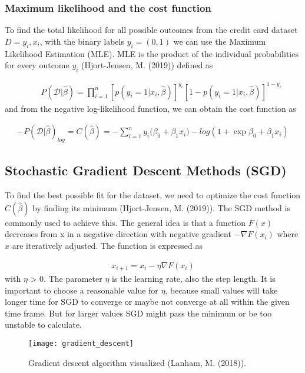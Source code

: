 \documentclass[11pt,english, A4]{article}
\begin{document}
\subsubsection{Maximum likelihood and the cost function}

To find the total likelihood for all possible outcomes from the credit card dataset $D = {y_i, x_i}$, with the binary labels $y_i  = {({0, 1})}$ we can use the Maximum Likelihood Estimation (MLE). MLE is the product of the individual probabilities for every outcome $y_i$ (Hjort-Jensen, M. (2019)) defined as

\begin{align}
\qquad P(\mathcal{D}|\hat{\beta}) =\prod_{i=1}^n [p(y_i = 1| x_i, \hat{\beta})]^{y_i}[1-p(y_i = 1| x_i, \hat{\beta})]^{1-y_i} 
\end{align}
and from the negative log-likelihood function, we can obtain the cost function as

\begin{align}
-{P(\mathcal{D}|\hat{\beta})_{log}} = C(\hat\beta) = - \sum_{i=1 }^{n} {y_i({\beta}_0 + {\beta}_1x_i}) - log(1+\exp{\beta}_0 + {\beta}_1x_i)
\end{align}


\subsection{Stochastic Gradient Descent Methods (SGD)}
To find the best possible fit for the dataset, we need to optimize the cost function $C(\hat\beta)$ by finding its minimum (Hjort-Jensen, M. (2019)). The SGD method is commonly used to achieve this. The general idea is that a function $F(x)$ decreases from x in a negative direction with negative gradient $- \nabla F({x}_i)$ where $\textit{x}$ are iteratively adjusted. The function is expressed as

\begin{align}
{x}_{i+1} = {x}_i - \eta\nabla F({x}_i)
\end{align}
with $\eta$ > 0.
The parameter $\eta$ is the learning rate, also the step length. It is important to choose a reasonable value for $\eta$, because small values will take longer time for SGD to converge or maybe not converge at all within the given time frame.  But for larger values SGD might pass the minimum or be too unstable to calculate.

\begin{figure}[H]
  \begin{center}
  \texttt{[image: gradient\_descent]}
  \caption{Gradient descent algorithm visualized (Lanham, M. (2018)).}
  \end{center}
\end{figure}
\end{document}
